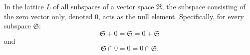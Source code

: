 In the lattice $L$ of all subspaces of a vector space $\mathfrak{R}$, the subspace consisting of the zero vector only, denoted $0$, acts as the null element. Specifically, for every subspace $\mathfrak{S}$:
$$
\mathfrak{S} + 0 = \mathfrak{S} = 0 + \mathfrak{S}
$$
and
$$
\mathfrak{S} \cap 0 = 0 = 0 \cap \mathfrak{S}.
$$
